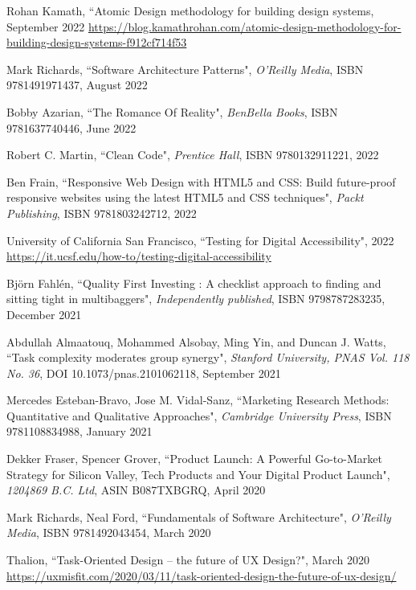 \begin{thebibliography}{100}
 Rohan Kamath, ``Atomic Design methodology for building design systems, September 2022
\href{https://blog.kamathrohan.com/atomic-design-methodology-for-building-design-systems-f912cf714f53}{https://blog.kamathrohan.com/atomic-design-methodology-for-building-design-systems-f912cf714f53}

 Mark Richards, ``Software Architecture Patterns", 
\emph{O'Reilly Media}, ISBN 9781491971437, August 2022

 Bobby Azarian, ``The Romance Of Reality", \emph{BenBella Books}, ISBN 9781637740446, June 2022

 Robert C. Martin, ``Clean Code", \emph{Prentice Hall}, ISBN 9780132911221, 2022

 Ben Frain, ``Responsive Web Design with HTML5 and CSS: Build future-proof responsive 
websites using the latest HTML5 and CSS techniques", \emph{Packt Publishing}, ISBN 9781803242712, 2022

 University of California San Francisco, ``Testing for Digital Accessibility", 2022
\href{https://it.ucsf.edu/how-to/testing-digital-accessibility}{https://it.ucsf.edu/how-to/testing-digital-accessibility}

 Björn Fahlén, ``Quality First Investing : A checklist approach to finding and sitting tight 
in multibaggers", \emph{Independently published}, ISBN 9798787283235, December 2021

 Abdullah Almaatouq, Mohammed Alsobay, Ming Yin, and Duncan J. Watts, ``Task complexity moderates 
group synergy", \emph{Stanford University, PNAS Vol. 118 No. 36}, DOI 10.1073/pnas.2101062118, September 2021

 Mercedes Esteban-Bravo, Jose M. Vidal-Sanz, ``Marketing Research Methods: Quantitative and 
Qualitative Approaches", \emph{Cambridge University Press}, ISBN 9781108834988, January 2021

 Dekker Fraser, Spencer Grover, ``Product Launch: A Powerful Go-to-Market Strategy for Silicon 
Valley, Tech Products and Your Digital Product Launch", \emph{1204869 B.C. Ltd}, ASIN B087TXBGRQ, April 2020

 Mark Richards, Neal Ford, ``Fundamentals of Software Architecture",
\emph{O'Reilly Media}, ISBN 9781492043454, March 2020  

 Thalion, ``Task-Oriented Design -- the future of UX Design?", March 2020
\href{https://uxmisfit.com/2020/03/11/task-oriented-design-the-future-of-ux-design/}{https://uxmisfit.com/2020/03/11/task-oriented-design-the-future-of-ux-design/}


\end{thebibliography}
